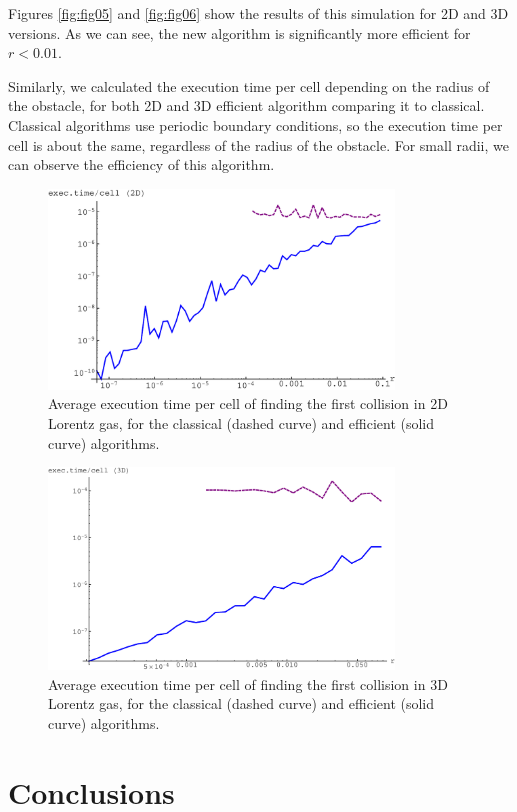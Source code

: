 \documentclass[prl,amsmath,amssymb, twocolumn, showpacs]{revtex4-1}
\begin{document}
Figures \ref{fig:fig05} and \ref{fig:fig06} show the results of this simulation for 2D and 3D versions. As we can see, the new algorithm is significantly more efficient for $r < 0.01$.

Similarly, we calculated the execution time per cell depending on the radius of the obstacle, for both 2D and 3D efficient algorithm comparing it to classical. Classical algorithms use periodic boundary conditions, so the execution time per cell is about the same, regardless of the radius of the obstacle. For small radii, we can observe the efficiency of this algorithm.

\begin{figure}
\centering
\includegraphics [width=260pt]{exectimepercell-2D.pdf}
\caption{Average execution time per cell of finding the first collision in 2D Lorentz gas, for the classical (dashed curve) and efficient (solid curve) algorithms.}
\label{fig:exectimepercell2D}
\end{figure}

\begin{figure}
\centering
\includegraphics [width=260pt]{exectimepercell-3D.pdf}
\caption{Average execution time per cell of finding the first collision in 3D Lorentz gas, for the classical (dashed curve) and efficient (solid curve) algorithms.}
\label{fig:exectimepercell3D}
\end{figure}




\section{Conclusions}  
\end{document}
